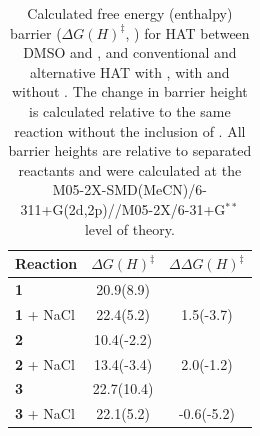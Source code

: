 \begin{table}[!htbp]
\caption[Calculated free energy (enthalpy) barrier for HAT between DMSO and \cumo, and conventional and alternative HAT with \bno, with and without .]{Calculated free energy (enthalpy) barrier ($\Delta G(H)^\ddagger$, \kcalmol) for HAT between DMSO and \cumo, and conventional and alternative HAT with \bno, with and without . The change in barrier height is calculated relative to the same reaction without the inclusion of . All barrier heights are relative to separated reactants and were calculated at the M05-2X-SMD(MeCN)/6-311+G(2d,2p)//M05-2X/6-31+G$^{**}$ level of theory.}
\label{tab:dmso-dG}
\begin{tabular}{l c c}
Reaction    &  $\Delta G(H)^\ddagger$ &  $\Delta \Delta G(H)^\ddagger$ \\
\hline
\textbf{1}  & 20.9(8.9)  &              \\
\textbf{1} + NaCl & 22.4(5.2)  &  1.5(-3.7)   \\
\textbf{2}    & 10.4(-2.2) &              \\
\textbf{2} + NaCl & 13.4(-3.4) &  2.0(-1.2) \\
\textbf{3} & 22.7(10.4) &                  \\
\textbf{3} + NaCl & 22.1(5.2) & -0.6(-5.2)
\end{tabular}
\end{table}

